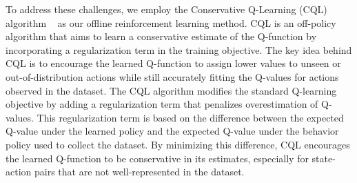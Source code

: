 To address these challenges, we employ the Conservative Q-Learning (CQL) algorithm ~\cite{kumar2020conservative} as our offline reinforcement learning method. CQL is an off-policy algorithm that aims to learn a conservative estimate of the Q-function by incorporating a regularization term in the training objective. The key idea behind CQL is to encourage the learned Q-function to assign lower values to unseen or out-of-distribution actions while still accurately fitting the Q-values for actions observed in the dataset. The CQL algorithm modifies the standard Q-learning objective by adding a regularization term that penalizes overestimation of Q-values. This regularization term is based on the difference between the expected Q-value under the learned policy and the expected Q-value under the behavior policy used to collect the dataset. By minimizing this difference, CQL encourages the learned Q-function to be conservative in its estimates, especially for state-action pairs that are not well-represented in the dataset.